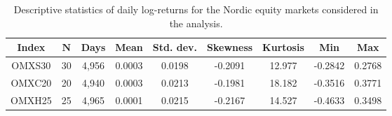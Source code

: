 \begin{table}[t!]
\centering
\caption{Descriptive statistics of daily log-returns for the Nordic equity markets considered in the analysis.}
\label{tab:summary_data}
\small
\begin{tabular}{ccccccccc}
\hline
\textbf{Index} & $\boldsymbol{N}$ & \textbf{Days} & \textbf{Mean} & \textbf{Std. dev.} & \textbf{Skewness} & \textbf{Kurtosis} & \textbf{Min} & \textbf{Max} \\
\hline
OMXS30 & 30 & 4,956 & 0.0003 & 0.0198 & -0.2091 & 12.977 & -0.2842 & 0.2768 \\
OMXC20 & 20 & 4,940 & 0.0003 & 0.0213 & -0.1981 & 18.182 & -0.3516 & 0.3771 \\
OMXH25 & 25 & 4,965 & 0.0001 & 0.0215 & -0.2167 & 14.527 & -0.4633 & 0.3498 \\
\hline
\end{tabular}
\end{table}
